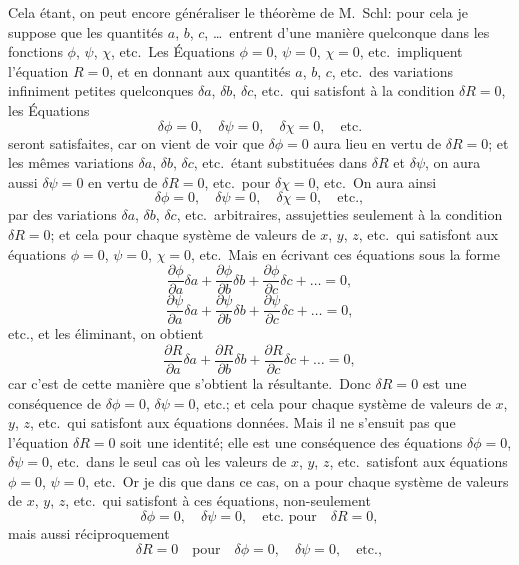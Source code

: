 \documentclass[11pt,a4paper]{book}
\theoremstyle{plain}
\begin{document}
Cela \'{e}tant, on peut encore g\'{e}n\'{e}raliser le th\'{e}or\`{e}me de M.~Schl\afli: pour cela je suppose que les quantit\'{e}s $a$, $b$, $c$, \ldots\ entrent d'une mani\`{e}re quelconque dans les fonctions $\phi$, $\psi$, $\chi$, etc.\ Les \'{E}quations $\phi=0$, $\psi=0$, $\chi=0$, etc.\ impliquent l'\'{e}quation $R=0$, et en donnant aux quantit\'{e}s $a$, $b$, $c$, etc.\ des variations infiniment petites quelconques $\delta a$, $\delta b$, $\delta c$, etc.\ qui satisfont \`{a} la condition $\delta R=0$, les \'{E}quations
\[
\delta\phi=0,\quad \delta\psi=0,\quad \delta\chi=0,\quad \text{etc.}
\]
seront satisfaites, car on vient de voir que $\delta\phi=0$ aura lieu en vertu de $\delta R=0$; et les m\^{e}mes variations $\delta a$, $\delta b$, $\delta c$, etc.\ \'{e}tant substitu\'{e}es dans $\delta R$ et $\delta\psi$, on aura aussi $\delta\psi=0$ en vertu de $\delta R=0$, etc.\ pour $\delta\chi=0$, etc.\ On aura ainsi
\[
\delta\phi=0,\quad \delta\psi=0,\quad \delta\chi=0,\quad \text{etc.},
\]
par des variations $\delta a$, $\delta b$, $\delta c$, etc.\ arbitraires, assujetties seulement \`{a} la condition $\delta R=0$; et cela pour chaque syst\`{e}me de valeurs de $x$, $y$, $z$, etc.\ qui satisfont aux \'{e}quations $\phi=0$, $\psi=0$, $\chi=0$, etc.\ Mais en \'{e}crivant ces \'{e}quations sous la forme
\[
\frac{\partial\phi}{\partial a}\delta a+\frac{\partial\phi}{\partial b}\delta b+\frac{\partial\phi}{\partial c}\delta c+\ldots=0,
\]
\[
\frac{\partial\psi}{\partial a}\delta a+\frac{\partial\psi}{\partial b}\delta b+\frac{\partial\psi}{\partial c}\delta c+\ldots=0,
\]
etc.,
et les \'{e}liminant, on obtient
\[
\frac{\partial R}{\partial a}\delta a+\frac{\partial R}{\partial b}\delta b+\frac{\partial R}{\partial c}\delta c+\ldots=0,
\]
car c'est de cette mani\`{e}re que s'obtient la r\'{e}sultante.\ Donc $\delta R=0$ est une cons\'{e}quence de $\delta\phi=0$, $\delta\psi=0$, etc.; et cela pour chaque syst\`{e}me de valeurs de $x$, $y$, $z$, etc.\ qui satisfont aux \'{e}quations donn\'{e}es. Mais il ne s'ensuit pas que l'\'{e}quation $\delta R=0$ soit une identit\'{e}; elle est une cons\'{e}quence des \'{e}quations $\delta\phi=0$, $\delta\psi=0$, etc.\ dans le seul cas o\`{u} les valeurs de $x$, $y$, $z$, etc.\ satisfont aux \'{e}quations $\phi=0$, $\psi=0$, etc.\ Or je dis que dans ce cas, on a pour chaque syst\`{e}me de valeurs de $x$, $y$, $z$, etc.\ qui satisfont \`{a} ces \'{e}quations, non-seulement
\[
\delta\phi=0,\quad \delta\psi=0,\quad \text{etc.\ pour}\quad \delta R=0,
\]
mais aussi r\'{e}ciproquement
\[
\delta R=0\quad \text{pour}\quad \delta\phi=0,\quad \delta\psi=0,\quad \text{etc.},
\]
\end{document}
